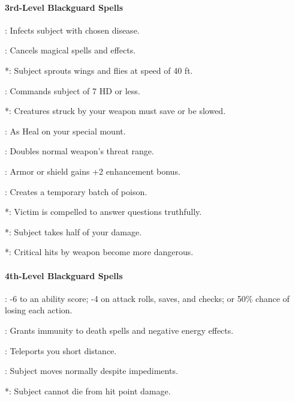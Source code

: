 \paragraph{3rd-Level Blackguard Spells}
\begin{list}{}{\leftmargin=1em}
 \item {}: Infects subject with chosen disease. %
 \item {}: Cancels magical spells and effects.
 \item {}*: Subject sprouts wings and flies at speed of 40 ft. %
 \item {}: Commands subject of 7 HD or less.
 \item {}*: Creatures struck by your weapon must save or be slowed. %
 \item {}: As Heal on your special mount.
 \item {}: Doubles normal weapon's threat range.
 \item {}: Armor or shield gains +2 enhancement bonus.
 \item {}: Creates a temporary batch of poison. %
 \item {}*: Victim is compelled to answer questions truthfully. %
 \item {}*: Subject takes half of your damage.
 \item {}*: Critical hits by weapon become more dangerous. %
\end{list}
\paragraph{4th-Level Blackguard Spells}
\begin{list}{}{\leftmargin=1em}
 \item {}: -6 to an ability score; -4 on attack rolls, saves, and checks; or 50\% chance of losing each action. %
 \item {}: Grants immunity to death spells and negative energy effects.
 \item {}: Teleports you short distance.
 \item {}: Subject moves normally despite impediments.
 \item {}*: Subject cannot die from hit point damage.
\end{list}
